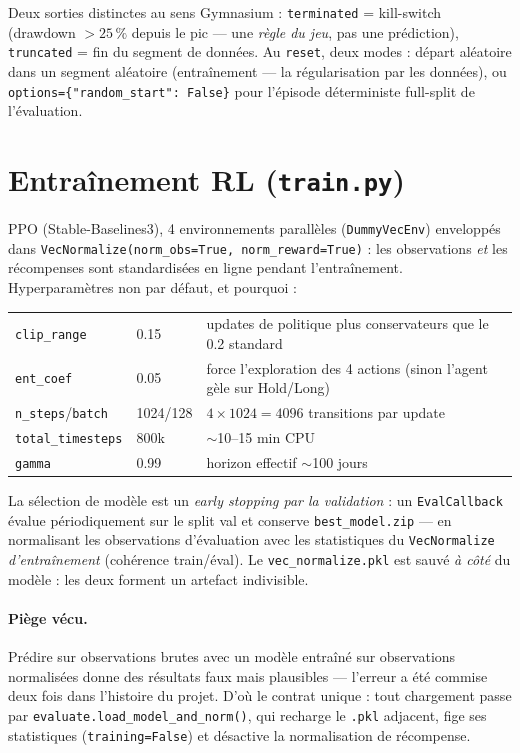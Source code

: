 \documentclass[11pt,a4paper]{article}
\newcommand{\code}[1]{\texttt{#1}}
\newcommand{\piege}[1]{\paragraph{\textcolor{red!70!black}{Piège vécu.}} #1}
\begin{document}
Deux sorties distinctes au sens Gymnasium : \code{terminated} = kill-switch
(drawdown $> 25\,\%$ depuis le pic --- une \emph{règle du jeu}, pas une
prédiction), \code{truncated} = fin du segment de données. Au \code{reset},
deux modes : départ aléatoire dans un segment aléatoire (entraînement --- la
régularisation par les données), ou \code{options=\{"random\_start": False\}}
pour l'épisode déterministe full-split de l'évaluation.

\section{Entraînement RL (\code{train.py})}

PPO (Stable-Baselines3), 4 environnements parallèles (\code{DummyVecEnv})
enveloppés dans \code{VecNormalize(norm\_obs=True, norm\_reward=True)} :
les observations \emph{et} les récompenses sont standardisées en ligne
pendant l'entraînement. Hyperparamètres non par défaut, et pourquoi :

\begin{center}\small
\begin{tabular}{@{}llp{8.6cm}@{}}
\toprule
\code{clip\_range} & 0.15 & updates de politique plus conservateurs que le 0.2 standard \\
\code{ent\_coef} & 0.05 & force l'exploration des 4 actions (sinon l'agent gèle sur Hold/Long) \\
\code{n\_steps}/\code{batch} & 1024/128 & $4 \times 1024 = 4096$ transitions par update \\
\code{total\_timesteps} & 800k & $\sim$10--15 min CPU \\
\code{gamma} & 0.99 & horizon effectif $\sim$100 jours \\
\bottomrule
\end{tabular}
\end{center}

La sélection de modèle est un \emph{early stopping par la validation} : un
\code{EvalCallback} évalue périodiquement sur le split val et conserve
\code{best\_model.zip} --- en normalisant les observations d'évaluation avec
les statistiques du \code{VecNormalize} \emph{d'entraînement} (cohérence
train/éval). Le \code{vec\_normalize.pkl} est sauvé \emph{à côté} du modèle :
les deux forment un artefact indivisible.

\piege{Prédire sur observations brutes avec un modèle entraîné sur
observations normalisées donne des résultats faux mais plausibles --- l'erreur
a été commise deux fois dans l'histoire du projet. D'où le contrat unique :
tout chargement passe par \code{evaluate.load\_model\_and\_norm()}, qui
recharge le \code{.pkl} adjacent, fige ses statistiques
(\code{training=False}) et désactive la normalisation de récompense.}
\end{document}
